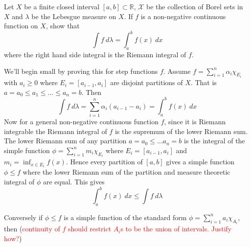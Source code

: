 \begin{exercise}[L*]
  Let $X$ be a finite closed interval $[a, b] \subset \mathbb{R}$, $\mathcal{X}$ be the collection of Borel sets in $X$ and $\lambda$ be the Lebesgue measure on $X$. If $f$ is a non-negative continuous function on $X$, show that \[
    \int f \ d \lambda = \int_{a}^{b} f(x) \ d x
  \]
  where the right hand side integral is the Riemann integral of $f$.
\end{exercise}
\begin{solution}
  We'll begin small by proving this for step functions $f$. Assume $f = \sum_{i = 1}^{n} \alpha_i \chi_{E_i}$ with $a_i \ge 0$ where $E_i = [a_{ i-1}, a_{i}]$ are disjoint partitions of $X$. That is $a = a_0 \le a_1 \le \ldots \le a_n = b$. Then \[
    \int f \ d \lambda = \sum_{i = 1}^{n} \alpha_i (a_{i-1} - a_i) = \int_{a}^{b} f(x) \ d x
  \]
  Now for a general non-negative continuous function $f$, since it is Riemann integrable the Riemann integral of $f$ is the supremum of the lower Riemann sum. The lower Riemann sum of any partition $a=a_0 \le \ldots a_n = b$ is the integral of the simple function $\phi = \sum_{i = 1}^{n} m_i \chi_{E_i}$ where $E_i = [a_{ i-1}, a_i]$ and $ m_i = \inf_{x \in E_i} f(x)$. Hence every partition of $[a, b]$ gives a simple function $\phi \le f$ where the lower Riemann sum of the partition and measure theoretic integral of $\phi$ are equal. This gives $$\int_{a}^{b} f(x) \ dx  \le \int f \ d  \lambda$$

  Conversely if $\phi \le f$ is a simple function of the standard form $\phi = \sum_{i = 1}^{n} a_i \chi_{A_i}$, then (\textcolor{red}{continuity of $f$ should restrict $A_i$s to be the union of intervals. Justify how?})
\end{solution}

